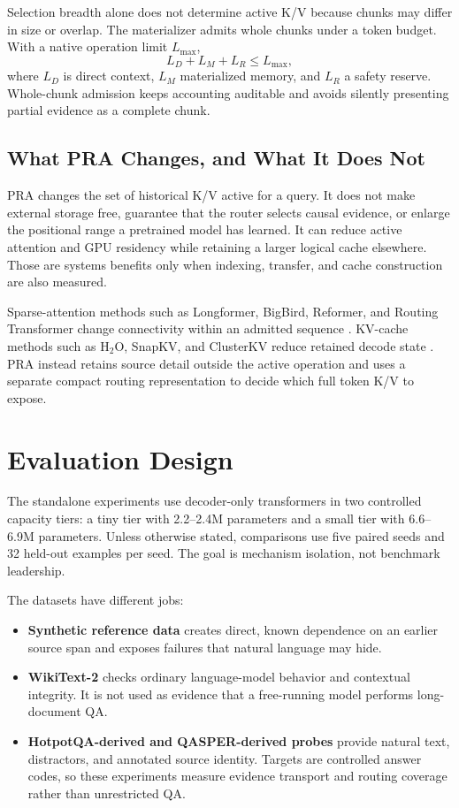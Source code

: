 \documentclass[11pt]{article}
\begin{document}
Selection breadth alone does not determine active K/V because chunks may differ in size
or overlap. The materializer admits whole chunks under a token budget. With a native
operation limit $L_{\max}$,
\begin{equation}
  L_D + L_M + L_R \leq L_{\max},
  \label{eq:budget}
\end{equation}
where $L_D$ is direct context, $L_M$ materialized memory, and $L_R$ a safety reserve.
Whole-chunk admission keeps accounting auditable and avoids silently presenting partial
evidence as a complete chunk.

\subsection{What PRA Changes, and What It Does Not}

PRA changes the set of historical K/V active for a query. It does not make external
storage free, guarantee that the router selects causal evidence, or enlarge the positional
range a pretrained model has learned. It can reduce active attention and GPU residency
while retaining a larger logical cache elsewhere. Those are systems benefits only when
indexing, transfer, and cache construction are also measured.

Sparse-attention methods such as Longformer, BigBird, Reformer, and Routing Transformer
change connectivity within an admitted sequence
\cite{beltagy2020longformer,zaheer2020bigbird,kitaev2020reformer,roy2021routing}. KV-cache
methods such as H$_2$O, SnapKV, and ClusterKV reduce retained decode state
\cite{zhang2023h2o,li2024snapkv,liu2024clusterkv}. PRA instead retains source detail outside
the active operation and uses a separate compact routing representation to decide which
full token K/V to expose.

\section{Evaluation Design}
\label{sec:evaluation}

The standalone experiments use decoder-only transformers in two controlled capacity
tiers: a tiny tier with 2.2--2.4M parameters and a small tier with 6.6--6.9M parameters.
Unless otherwise stated, comparisons use five paired seeds and 32 held-out examples per
seed. The goal is mechanism isolation, not benchmark leadership.

The datasets have different jobs:
\begin{itemize}[leftmargin=*]
\item \textbf{Synthetic reference data} creates direct, known dependence on an earlier
source span and exposes failures that natural language may hide.
\item \textbf{WikiText-2} checks ordinary language-model behavior and contextual integrity.
It is not used as evidence that a free-running model performs long-document QA.
\item \textbf{HotpotQA-derived and QASPER-derived probes} provide natural text, distractors,
and annotated source identity. Targets are controlled answer codes, so these experiments
measure evidence transport and routing coverage rather than unrestricted QA.
\end{itemize}
\end{document}
